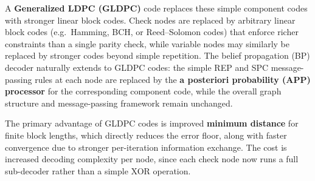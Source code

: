 \documentclass[11pt]{article}
\begin{document}
A \textbf{Generalized LDPC (GLDPC)} code replaces these simple component codes with 
stronger linear block codes. Check nodes are replaced by arbitrary linear block codes 
(e.g.\ Hamming, BCH, or Reed--Solomon codes) that enforce richer constraints than a 
single parity check, while variable nodes may similarly be replaced by stronger codes 
beyond simple repetition. The belief propagation (BP) decoder naturally extends to 
GLDPC codes: the simple REP and SPC message-passing rules at each node are replaced 
by the \textbf{a posteriori probability (APP) processor} for the corresponding 
component code, while the overall graph structure and message-passing framework remain unchanged.

The primary advantage of GLDPC codes is improved \textbf{minimum distance} for finite 
block lengths, which directly reduces the error floor, along with faster convergence 
due to stronger per-iteration information exchange. The cost is increased decoding 
complexity per node, since each check node now runs a full sub-decoder rather than a 
simple XOR operation.
\end{document}
